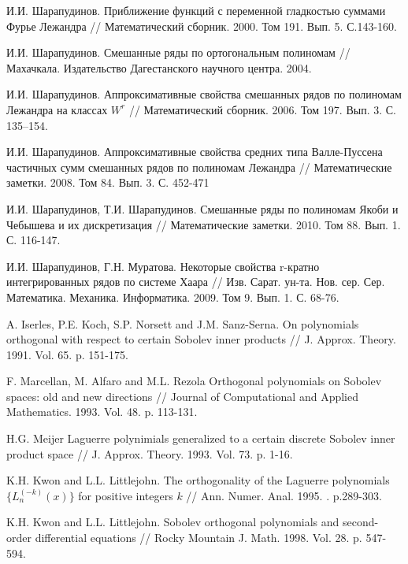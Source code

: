 

 И.И. Шарапудинов. Приближение функций с переменной гладкостью суммами Фурье Лежандра // Математический сборник. 2000. Том 191. Вып. 5. С.143-160.

 И.И. Шарапудинов. Смешанные ряды по ортогональным полиномам // Махачкала. Издательство Дагестанского научного центра. 2004.

 И.И. Шарапудинов. Аппроксимативные свойства смешанных рядов по полиномам Лежандра на классах $W^r$ // Математический сборник. 2006. Том 197. Вып. 3. С. 135–154.

 И.И. Шарапудинов. Аппроксимативные свойства средних типа Валле-Пуссена частичных сумм смешанных рядов по полиномам Лежандра // Математические заметки. 2008. Том 84. Вып. 3. С. 452-471

 И.И. Шарапудинов, Т.И. Шарапудинов. Смешанные ряды по полиномам Якоби и Чебышева и их дискретизация // Математические заметки. 2010. Том 88. Вып. 1. С. 116-147.

 И.И. Шарапудинов,  Г.Н. Муратова. Некоторые свойства r-кратно интегрированных рядов по системе Хаара // Изв. Сарат. ун-та. Нов. сер. Сер. Математика. Механика. Информатика. 2009. Том 9. Вып. 1. С. 68-76.

 A. Iserles, P.E. Koch, S.P. Norsett and J.M. Sanz-Serna. On polynomials  orthogonal  with respect  to certain Sobolev inner products // J. Approx. Theory. 1991. Vol. 65. p. 151-175.

 F. Marcellan, M. Alfaro and M.L. Rezola Orthogonal polynomials on Sobolev spaces: old and new directions // Journal of Computational and Applied Mathematics. 1993. Vol. 48. p. 113-131.

 H.G. Meijer Laguerre polynimials generalized to a certain discrete Sobolev inner product space // J. Approx. Theory. 1993. Vol. 73. p. 1-16.

 K.H. Kwon and L.L. Littlejohn. The orthogonality of the Laguerre polynomials $\{L_n^{(-k)}(x)\}$ for positive integers $k$ // Ann. Numer. Anal. 1995. . p.289-303.

 K.H. Kwon and L.L. Littlejohn. Sobolev orthogonal polynomials and second-order differential equations // Rocky Mountain J. Math. 1998. Vol. 28. p. 547-594.

